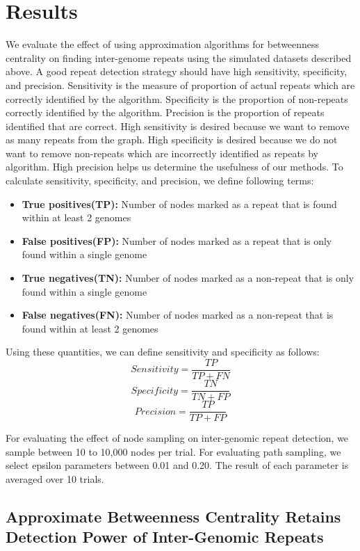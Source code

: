 \documentclass[runningheads,a4paper]{llncs}
\begin{document}
\section{Results} 
We evaluate the effect of using approximation algorithms for betweenness centrality on finding inter-genome repeats using the simulated datasets described above.
A good repeat detection strategy should have high sensitivity, specificity, and precision. Sensitivity is the measure of proportion of actual repeats which are correctly identified by the algorithm. Specificity is the proportion of non-repeats correctly identified by the algorithm. Precision is the proportion of repeats identified that are correct. High sensitivity is desired because we want to remove as many repeats from the graph. High specificity is desired because we do not want to remove non-repeats which are incorrectly identified as repeats by algorithm. High precision helps us determine the usefulness of our methods. To calculate sensitivity, specificity, and precision, we define following terms:
\begin{itemize}
\item \textbf{True positives(TP):} Number of nodes marked as a repeat that is found within at least 2 genomes
\item \textbf{False positives(FP):} Number of nodes marked as a repeat that is only found within a single genome
\item \textbf{True negatives(TN):} Number of nodes marked as a non-repeat that is only found within a single genome
\item \textbf{False negatives(FN):} Number of nodes marked as a non-repeat that is found within at least 2 genomes
\end{itemize}

Using these quantities, we can define sensitivity and specificity as follows:
 $$Sensitivity = \frac{TP}{TP+FN}$$
 $$Specificity = \frac{TN}{TN+FP}$$
 $$Precision = \frac{TP}{TP + FP}$$

For evaluating the effect of node sampling on inter-genomic repeat detection, we sample between 10 to 10,000 nodes per trial.
For evaluating path sampling, we select epsilon parameters between 0.01 and 0.20.
The result of each parameter is averaged over 10 trials.

\subsection*{Approximate Betweenness Centrality Retains Detection Power of Inter-Genomic Repeats}
\end{document}
